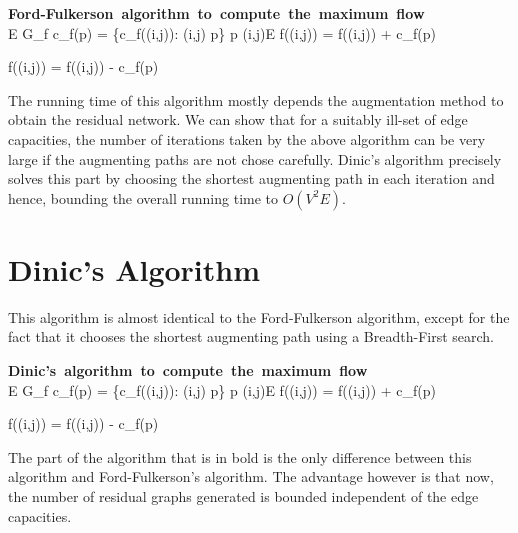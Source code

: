 \documentclass[BTech]{iitmdiss}
\begin{document}
	    \begin{program}
	      \mbox{\textbf{Ford-Fulkerson algorithm to compute the maximum flow}}
	      \BEGIN \\ %
		\FOR {} \in E \DO
		\OD
		\WHILE \exists {} G_f 
		    c_f(p) = \min\{c_f((i,j)): (i,j) \in p\}
		    \FOR {} \in p \DO
		      \IF (i,j)\in E 
		      \THEN 
			f((i,j)) = f((i,j)) + c_f(p)
		      
		      \ELSE
			f((i,j)) = f((i,j)) - c_f(p)
		      \FI
		    \OD
		 
	      \END
	    \end{program}
	    
	    The running time of this algorithm mostly depends the augmentation method to obtain the residual network. We can show that 
	    for a suitably ill-set of edge capacities, the number of iterations taken by the above algorithm can be very large if the augmenting
	    paths are not chose carefully. Dinic's algorithm precisely solves this part by choosing the shortest augmenting path in each iteration
	    and hence, bounding the overall running time to $O(V^2E)$.
	  
	  \section{Dinic's Algorithm}
	    This algorithm is almost identical to the Ford-Fulkerson algorithm, except for the fact that it chooses the shortest augmenting path using 
	    a Breadth-First search.
	    
	    \begin{program}
	      \mbox{\textbf{Dinic's algorithm to compute the maximum flow}}
	      \BEGIN \\ %
		\FOR {} \in E \DO
		  \text{Initialise f((i,j)) = 0}
		\OD
		\WHILE \exists {} G_f 
		    c_f(p) = \min\{c_f((i,j)): (i,j) \in p\}
		    \FOR {} \in p \DO
		      \IF (i,j)\in E 
		      \THEN 
			f((i,j)) = f((i,j)) + c_f(p)
		      
		      \ELSE
			f((i,j)) = f((i,j)) - c_f(p)
		      \FI
		    \OD
		 
	      \END
	    \end{program}
	    	  
	    The part of the algorithm that is in bold is the only difference between this algorithm and Ford-Fulkerson's algorithm. The advantage 
	    however is that now, the number of residual graphs generated is bounded independent of the edge capacities. \\
	    
\end{document}
